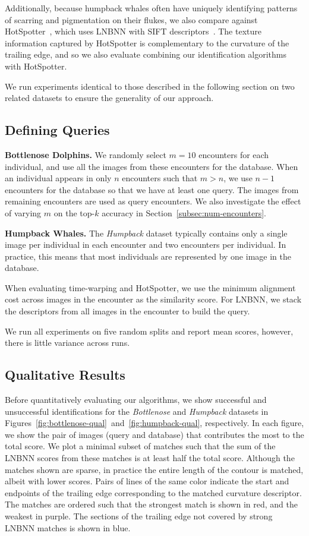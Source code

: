 \documentclass[10pt,twocolumn,letterpaper]{article}
\begin{document}
Additionally, because humpback whales often have uniquely identifying patterns
of scarring and pigmentation on their flukes, we also compare against
HotSpotter~\cite{Crall13}, which uses LNBNN with SIFT
descriptors~\cite{Lowe04}.  The texture information captured by HotSpotter is
complementary to the curvature of the trailing edge, and so we also evaluate
combining our identification algorithms with HotSpotter.

We run experiments identical to those described in the following section on two
related datasets to ensure the generality of our approach.

\subsection{Defining Queries}
\label{subsec:defining-queries}
\textbf{Bottlenose Dolphins.} 
We randomly select $m = 10$ encounters for each individual, and use all the images
from these encounters for the database.  When an individual appears in only $n$
encounters such that $m > n$, we use $n-1$ encounters for the database so that
we have at least one query.  The images from remaining encounters
are used as query encounters.  We also investigate the effect of
varying $m$ on the top-$k$ accuracy in Section~\ref{subsec:num-encounters}.

\textbf{Humpback Whales.}
The \emph{Humpback} dataset typically contains only a single image per
individual in each encounter and two encounters per individual.  In practice,
this means that most individuals are represented by one image in the database.

When evaluating time-warping and HotSpotter, we use the minimum alignment cost across images
in the encounter as the similarity score.  For LNBNN, we stack the descriptors
from all images in the encounter to build the query.

We run all experiments on five random splits and report mean scores,
however, there is little variance across runs.

\subsection{Qualitative Results}
Before quantitatively evaluating
our algorithms, we show successful and unsuccessful identifications for
the \emph{Bottlenose} and \emph{Humpback} datasets in
Figures~\ref{fig:bottlenose-qual}~and~\ref{fig:humpback-qual}, respectively.
In each figure, we show the pair of images (query and database) that
contributes the most to the total score.  We plot a minimal subset of matches
such that the sum of the LNBNN scores from these matches is at least half the
total score.  Although the matches shown are sparse, in practice the entire
length of the contour is matched, albeit with lower scores.  Pairs of lines of
the same color indicate the start and endpoints of the trailing edge
corresponding to the matched curvature descriptor.  The matches are ordered
such that the strongest match is shown in red, and the weakest in purple.  The
sections of the trailing edge not covered by strong LNBNN matches is shown in
blue.
\end{document}
